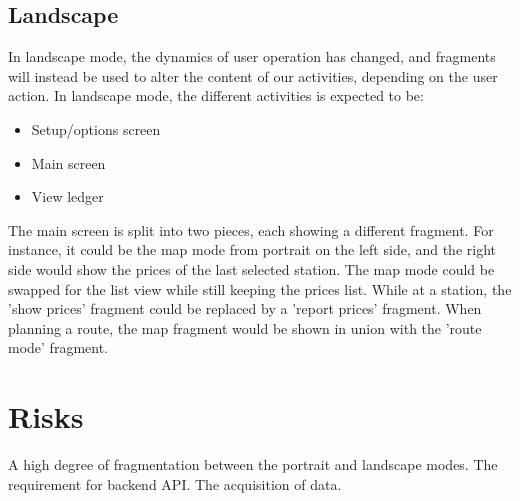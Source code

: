 \subsection{Landscape}
In landscape mode, the dynamics of user operation has changed, and fragments will instead be used to alter the content of our activities, depending on the user action. In landscape mode, the different activities is expected to be:
\begin{itemize}
	\item Setup/options screen
	\item Main screen
	\item View ledger
\end{itemize}

The main screen is split into two pieces, each showing a different fragment. For instance, it could be the map mode from portrait on the left side, and the right side would show the prices of the last selected station. The map mode could be swapped for the list view while still keeping the prices list. While at a station, the 'show prices' fragment could be replaced by a 'report prices' fragment. When planning a route, the map fragment would be shown in union with the 'route mode' fragment.

\section{Risks}
A high degree of fragmentation between the portrait and landscape modes.
The requirement for backend API.
The acquisition of data.